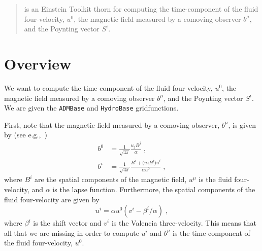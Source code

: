 \newenvironment{packed_itemize}{
\begin{itemize}
  \setlength{\itemsep}{0.0pt}
  \setlength{\parskip}{0.0pt}
  \setlength{\parsep}{ 0.0pt}
}{\end{itemize}}

\newenvironment{packed_enumerate}{
\begin{enumerate}
  \setlength{\itemsep}{0.0pt}
  \setlength{\parskip}{0.0pt}
  \setlength{\parsep}{ 0.0pt}
}{\end{enumerate}}

\begin{abstract}
  \thornname{} is an Einstein Toolkit thorn for computing the
  time-component of the fluid four-velocity, $u^0$, the magnetic field
  measured by a comoving observer $b^{\mu}$, and the Poynting vector
  $S^i$.
\end{abstract}


\section{Overview}
\label{sec:overview}

We want to compute the time-component of the fluid four-velocity, $u^0$,
the magnetic field measured by a comoving observer $b^{\mu}$, and the
Poynting vector $S^i$. We are given the \texttt{ADMBase} and
\texttt{HydroBase} gridfunctions.

First, note that the magnetic field measured by a comoving observer,
$b^{\mu}$, is given by (see e.g.,~\cite{duez2005relativistic})
\begin{align}
  b^{0} &= \frac{1}{\sqrt{4\pi}}\frac{u_{j}B^{j}}{\alpha}\;,\\
  b^{i} &= \frac{1}{\sqrt{4\pi}}\frac{B^{i} + \bigl(u_{j}B^{j}\bigr)u^{i}}{\alpha u^{0}}\;,
\end{align}
where $B^{i}$ are the spatial components of the magnetic field,
$u^{\mu}$ is the fluid four-velocity, and $\alpha$ is the lapse
function. Furthermore, the spatial components of the fluid four-velocity
are given by
\begin{equation}
  u^{i} = \alpha u^{0}\left(v^{i}-\beta^{i}/\alpha\right)\;,
\end{equation}
where $\beta^{i}$ is the shift vector and $v^{i}$ is the Valencia
three-velocity. This means that all that we are missing in order to
compute $u^{i}$ and $b^{\mu}$ is the time-component of the fluid
four-velocity, $u^{0}$.

